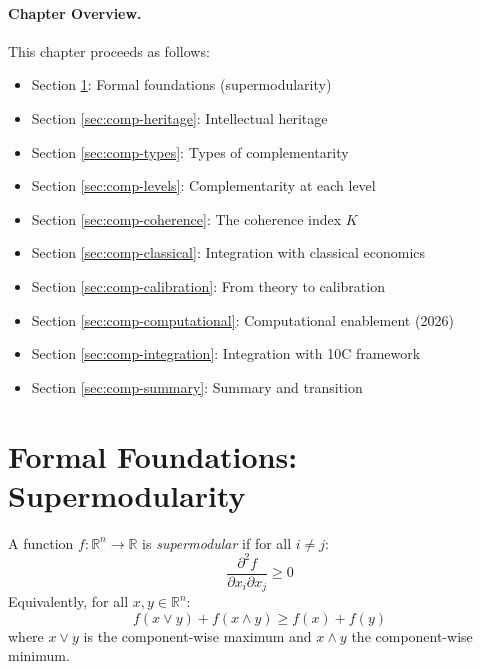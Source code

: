 \paragraph{Chapter Overview.}
This chapter proceeds as follows:
\begin{itemize}
    \item Section \ref{sec:comp-formal}: Formal foundations (supermodularity)
    \item Section \ref{sec:comp-heritage}: Intellectual heritage
    \item Section \ref{sec:comp-types}: Types of complementarity
    \item Section \ref{sec:comp-levels}: Complementarity at each level
    \item Section \ref{sec:comp-coherence}: The coherence index $K$
    \item Section \ref{sec:comp-classical}: Integration with classical economics
    \item Section \ref{sec:comp-calibration}: From theory to calibration
    \item Section \ref{sec:comp-computational}: Computational enablement (2026)
    \item Section \ref{sec:comp-integration}: Integration with 10C framework
    \item Section \ref{sec:comp-summary}: Summary and transition
\end{itemize}



\section{Formal Foundations: Supermodularity}
\label{sec:comp-formal}


\begin{definition}[Supermodularity]
A function $f: \mathbb{R}^n \to \mathbb{R}$ is \emph{supermodular} if for all $i \neq j$:
\begin{equation}
  \frac{\partial^2 f}{\partial x_i \partial x_j} \geq 0
  \label{eq:supermodularity}
\end{equation}
Equivalently, for all $x, y \in \mathbb{R}^n$:
\begin{equation}
  f(x \vee y) + f(x \wedge y) \geq f(x) + f(y)
\end{equation}
where $x \vee y$ is the component-wise maximum and $x \wedge y$ the component-wise minimum.
\end{definition}

